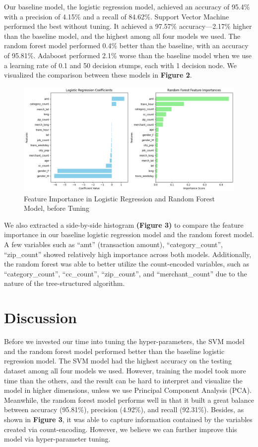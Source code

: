 \documentclass[sigconf, nonacm]{acmart}
\begin{document}
Our baseline model, the logistic regression model, achieved an accuracy of 95.4\% with a precision of 4.15\% and a recall of 84.62\%. Support Vector Machine performed the best without tuning. It achieved a 97.57\% accuracy---2.17\% higher than the baseline model, and the highest among all four models we used. The random forest model performed 0.4\% better than the baseline, with an accuracy of 95.81\%. Adaboost performed 2.1\% worse than the baseline model when we use a learning rate of 0.1 and 50 decision stumps, each with 1 decision node. We visualized the comparison between these models in {\bfseries Figure 2}.

\begin{figure}[h]
  \centering
  \includegraphics[width=\linewidth]{important-coeff-no-tuning.png}
  \caption{Feature Importance in Logistic Regression and Random Forest Model, before Tuning}
\end{figure}

We also extracted a side-by-side histogram {\bfseries (Figure 3)} to compare the feature importance in our baseline logistic regression model and the random forest model. A few variables such as ``amt'' (transaction amount), ``category\_count'', ``zip\_count'' showed relatively high importance across both models. Additionally, the random forest was able to better utilize the count-encoded variables, such as ``category\_count'', ``cc\_count'', ``zip\_count'', and ``merchant\_count'' due to the nature of the tree-structured algorithm. 


\section{Discussion}

Before we invested our time into tuning the hyper-parameters, the SVM model and the random forest model performed better than the baseline logistic regression model. The SVM model had the highest accuracy on the testing dataset among all four models we used. However, training the model took more time than the others, and the result can be hard to interpret and visualize the model in higher dimensions, unless we use Principal Component Analysis (PCA). Meanwhile, the random forest model performs well in that it built a great balance between accuracy (95.81\%), precision (4.92\%), and recall (92.31\%).  Besides, as shown in {\bfseries Figure 3}, it was able to capture information contained by the variables created via count-encoding. However, we believe we can further improve this model via hyper-parameter tuning.
\end{document}
